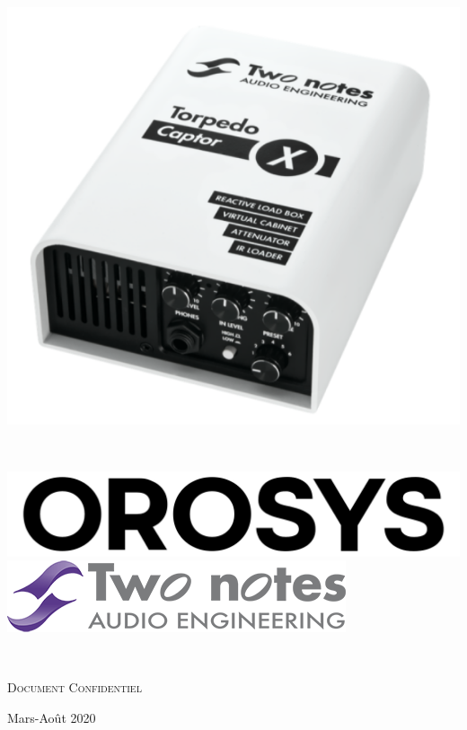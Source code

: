 \documentclass[a4paper]{article}
\begin{document}
\begin{titlepage}
    
  
  \begin{minipage}{0.49\textwidth}
    \begin{flushleft}
      \large
    \includegraphics[width=0.5\linewidth]{../img/captorx}\\ %
  \end{flushleft}
    
    \end{minipage}
    ~
    \begin{minipage}{0.49\textwidth}
    \begin{flushright} \large
      \includegraphics[width=0.5\linewidth]{../img/logo_orosys}\\[1cm]
      \includegraphics[width=0.5\linewidth]{../img/logo_twonotes}\\[1cm]
    \end{flushright}
    \end{minipage}\\[2cm]
    \begin{center}
      {\huge \textsc{Document Confidentiel} \\[2cm] }
    \end{center}

   
  \vspace*{\fill}
\begin{center}
{\large Mars-Août 2020 \\ }
\end{center}
  
\end{titlepage}
\end{document}
